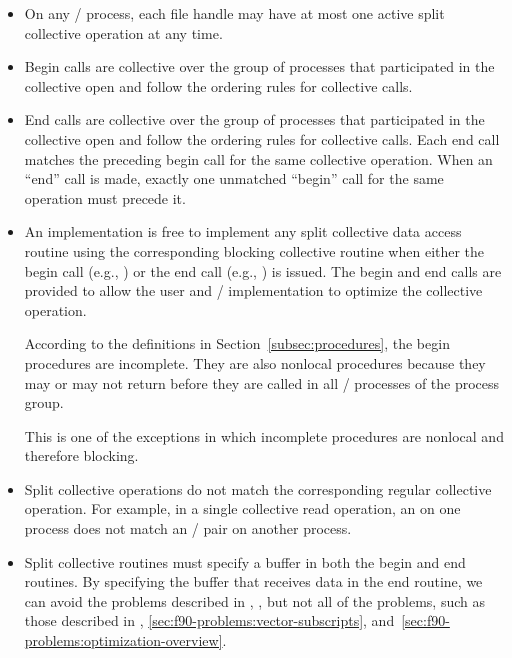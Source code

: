 \begin{itemize}
\item On any \MPI/ process,
      each file handle may have at most one active split collective
      operation at any time.

\item  Begin calls are collective over the group of processes
that participated in the collective open and follow the ordering
rules for collective calls.

\item End calls are collective over the group of processes that
participated in the collective open and follow the ordering
  rules for collective calls.
  Each end call matches
  the preceding begin call for the same collective
  operation.  When an ``end'' call is made, exactly one unmatched ``begin''
  call for the same operation must precede it.

\item An implementation is free to implement any split collective
data access routine using the corresponding blocking collective
routine when either the begin call (e.g.,
) or the end call (e.g.,
) is issued.  The begin and end calls are
provided to allow the user and \MPI/ implementation to optimize the
collective operation.

According to the definitions in Section~\ref{subsec:procedures}, 
the begin procedures are incomplete.
They are also nonlocal procedures because they may or may not return
before they are called in all \MPI/ processes of the process group.
\begin{users}
This is one of the exceptions in which incomplete procedures are nonlocal and therefore blocking.
\end{users}

\item Split collective operations do not match the corresponding
regular collective operation.
For example, in a single collective read operation,
an  on one process does not match
an / pair
on another process.

\item Split collective routines must specify a buffer
in both the begin and end routines.  By specifying the buffer
that receives data in the end routine, we can avoid
the problems described
in ,
,
but not all of the problems, such as those described in
,
\ref{sec:f90-problems:vector-subscripts},
and~\ref{sec:f90-problems:optimization-overview}.


\end{itemize}

